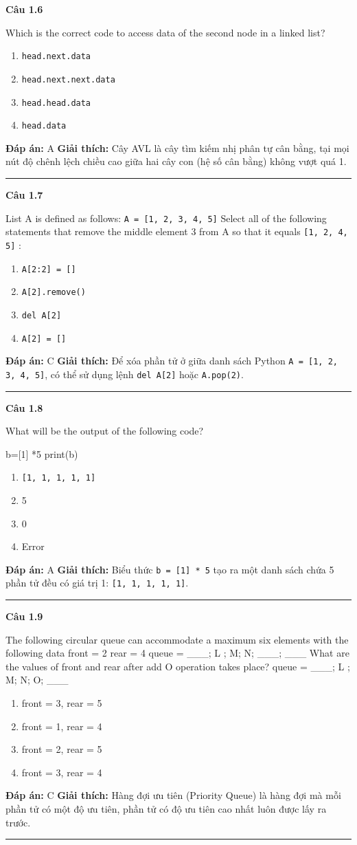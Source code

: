 \documentclass[11pt,a4paper]{article}
\newenvironment{question}[1]{%
  \par\vspace{1em}\noindent\textbf{\large Câu #1}\par\vspace{0.4em}
}{%
  \par\vspace{1em}\hrule\vspace{0.6em}
}
\newenvironment{choices}{%
  \begin{enumerate}[label=\textbf{\Alph*.},leftmargin=2.2em,itemsep=2pt,topsep=3pt]
}{%
  \end{enumerate}
}
\newcommand{\choice}{\item}
\newenvironment{codebox}{%
  \begin{tcolorbox}[colback=gray!8!white,colframe=gray!50!black,arc=1.5mm,boxrule=0.6pt,left=3mm,right=3mm,top=2.5mm,bottom=2.5mm]
  \ttfamily\small
}{%
  \end{tcolorbox}
}
\begin{document}
\begin{question}{1.6}
Which is the correct code to access data of the second node in a linked list?
\begin{choices}
\choice \texttt{head.next.data}
\choice \texttt{head.next.next.data}
\choice \texttt{head.head.data}
\choice \texttt{head.data}
\end{choices}
\textbf{Đáp án:} A
\textbf{Giải thích:} Cây AVL là cây tìm kiếm nhị phân tự cân bằng, tại mọi nút độ chênh lệch chiều cao giữa hai cây con (hệ số cân bằng) không vượt quá 1.
\end{question}

\begin{question}{1.7}
List A is defined as follows: \texttt{A = [1, 2, 3, 4, 5]} Select all of the following statements that remove the middle element 3 from A so that it equals \texttt{[1, 2, 4, 5]} :
\begin{choices}
\choice \texttt{A[2:2] = []}
\choice \texttt{A[2].remove()}
\choice \texttt{del A[2]}
\choice \texttt{A[2] = []}
\end{choices}
\textbf{Đáp án:} C
\textbf{Giải thích:} Để xóa phần tử ở giữa danh sách Python \texttt{A = [1, 2, 3, 4, 5]}, có thể sử dụng lệnh \texttt{del A[2]} hoặc \texttt{A.pop(2)}.
\end{question}

\begin{question}{1.8}
What will be the output of the following code?
\begin{codebox}
b=[1] *5
print(b)
\end{codebox}
\begin{choices}
\choice \texttt{[1, 1, 1, 1, 1]}
\choice 5
\choice 0
\choice Error
\end{choices}
\textbf{Đáp án:} A
\textbf{Giải thích:} Biểu thức \texttt{b = [1] * 5} tạo ra một danh sách chứa 5 phần tử đều có giá trị 1: \texttt{[1, 1, 1, 1, 1]}.
\end{question}

\begin{question}{1.9}
The following circular queue can accommodate a maximum six elements with the following data front = 2 rear = 4 queue = \_\_\_; L ; M; N; \_\_\_; \_\_\_ What are the values of front and rear after add O operation takes place? queue = \_\_\_; L ; M; N; O; \_\_\_
\begin{choices}
\choice front = 3, rear = 5
\choice front = 1, rear = 4
\choice front = 2, rear = 5
\choice front = 3, rear = 4
\end{choices}
\textbf{Đáp án:} C
\textbf{Giải thích:} Hàng đợi ưu tiên (Priority Queue) là hàng đợi mà mỗi phần tử có một độ ưu tiên, phần tử có độ ưu tiên cao nhất luôn được lấy ra trước.
\end{question}
\end{document}
